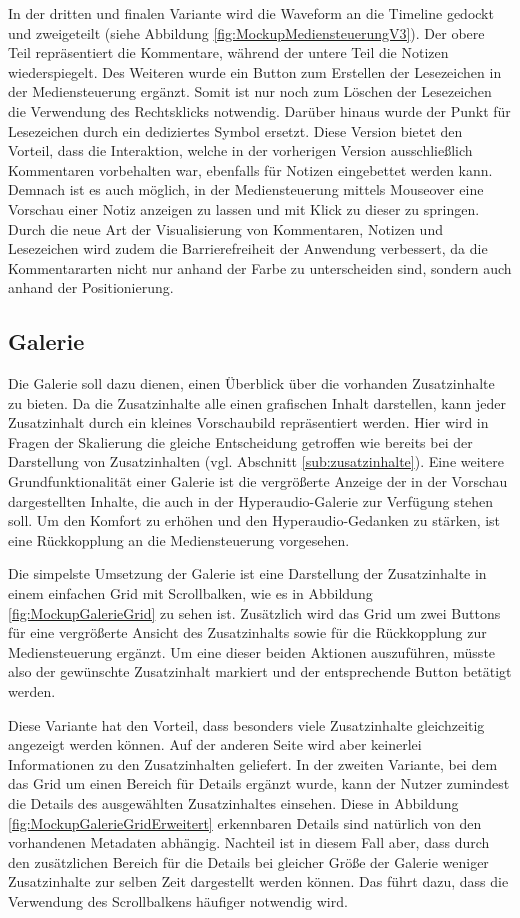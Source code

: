 In der dritten und finalen Variante wird die Waveform an die Timeline gedockt und zweigeteilt (siehe Abbildung \ref{fig:MockupMediensteuerungV3}). Der obere Teil repräsentiert die Kommentare, während der untere Teil die Notizen wiederspiegelt. Des Weiteren wurde ein Button zum Erstellen der Lesezeichen in der Mediensteuerung ergänzt. Somit ist nur noch zum Löschen der Lesezeichen die Verwendung des Rechtsklicks notwendig. Darüber hinaus wurde der Punkt für Lesezeichen durch ein dediziertes Symbol ersetzt. Diese Version bietet den Vorteil, dass die Interaktion, welche in der vorherigen Version ausschließlich Kommentaren vorbehalten war, ebenfalls für Notizen eingebettet werden kann. Demnach ist es auch möglich, in der Mediensteuerung mittels Mouseover eine Vorschau einer Notiz anzeigen zu lassen und mit Klick zu dieser zu springen. Durch die neue Art der Visualisierung von Kommentaren, Notizen und Lesezeichen wird zudem die Barrierefreiheit der Anwendung verbessert, da die Kommentararten nicht nur anhand der Farbe zu unterscheiden sind, sondern auch anhand der Positionierung.

\subsection{Galerie}
Die Galerie soll dazu dienen, einen Überblick über die vorhanden Zusatzinhalte zu bieten. Da die Zusatzinhalte alle einen grafischen Inhalt darstellen, kann jeder Zusatzinhalt durch ein kleines Vorschaubild repräsentiert werden. Hier wird in Fragen der Skalierung die gleiche Entscheidung getroffen wie bereits bei der Darstellung von Zusatzinhalten (vgl. Abschnitt \ref{sub:zusatzinhalte}).
Eine weitere Grundfunktionalität einer Galerie ist die vergrößerte Anzeige der in der Vorschau dargestellten Inhalte, die auch in der Hyperaudio-Galerie zur Verfügung stehen soll. Um den Komfort zu erhöhen und den Hyperaudio-Gedanken zu stärken, ist eine Rückkopplung an die Mediensteuerung vorgesehen.

Die simpelste Umsetzung der Galerie ist eine Darstellung der Zusatzinhalte in einem einfachen Grid  mit Scrollbalken, wie es in Abbildung \ref{fig:MockupGalerieGrid} zu sehen ist. Zusätzlich wird das Grid um zwei Buttons für eine vergrößerte Ansicht des Zusatzinhalts sowie für die Rückkopplung zur Mediensteuerung ergänzt. Um eine dieser beiden Aktionen auszuführen, müsste also der gewünschte Zusatzinhalt markiert und der entsprechende Button betätigt werden.

Diese Variante hat den Vorteil, dass besonders viele Zusatzinhalte gleichzeitig angezeigt werden können. Auf der anderen Seite wird aber keinerlei Informationen zu den Zusatzinhalten geliefert. In der zweiten Variante, bei dem das Grid um einen Bereich für Details ergänzt wurde, kann der Nutzer zumindest die Details des ausgewählten Zusatzinhaltes einsehen. Diese in Abbildung \ref{fig:MockupGalerieGridErweitert} erkennbaren Details sind natürlich von den vorhandenen Metadaten abhängig. Nachteil ist in diesem Fall aber, dass durch den zusätzlichen Bereich für die Details bei gleicher Größe der Galerie weniger Zusatzinhalte zur selben Zeit dargestellt werden können. Das führt dazu, dass die Verwendung des Scrollbalkens häufiger notwendig wird.

